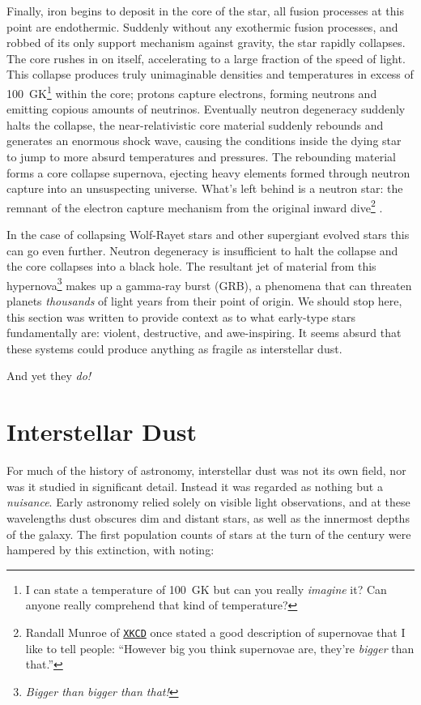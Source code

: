 Finally, iron begins to deposit in the core of the star, all fusion processes at this point are endothermic.
Suddenly without any exothermic fusion processes, and robbed of its only support mechanism against gravity, the star rapidly collapses.
The core rushes in on itself, accelerating to a large fraction of the speed of light.
This collapse produces truly unimaginable densities and temperatures in excess of \SI{100}{\giga\kelvin}\footnote{I can state a temperature of \SI{100}{\giga\kelvin} but can you really \emph{imagine} it? Can anyone really comprehend that kind of temperature?} within the core; protons capture electrons, forming neutrons and emitting copious amounts of neutrinos.
Eventually neutron degeneracy suddenly halts the collapse, the near-relativistic core material suddenly rebounds and generates an enormous shock wave, causing the conditions inside the dying star to jump to more absurd temperatures and pressures.
The rebounding material forms a core collapse supernova, ejecting heavy elements formed through neutron capture into an unsuspecting universe.
What's left behind is a neutron star: the remnant of the electron capture mechanism from the original inward dive\footnote{Randall Munroe of \href{https://what-if.xkcd.com/73/}{\texttt{XKCD}} once stated a good description of supernovae that I like to tell people: ``However big you think supernovae are, they're \emph{bigger} than that.''} \parencite[Ch.~13]{longairHighEnergyAstrophysics2011}.

In the case of collapsing Wolf-Rayet stars and other supergiant evolved stars this can go even further.
Neutron degeneracy is insufficient to halt the collapse and the core collapses into a black hole.
The resultant jet of material from this hypernova\footnote{\emph{Bigger than bigger than that!}} makes up a gamma-ray burst (GRB), a phenomena that can threaten planets \emph{thousands} of light years from their point of origin.
We should stop here, this section was written to provide context as to what early-type stars fundamentally are: violent, destructive, and awe-inspiring.
It seems absurd that these systems could produce anything as fragile as interstellar dust.

And yet they \emph{do!}

\section{Interstellar Dust}
\label{sec:dust}

For much of the history of astronomy, interstellar dust was not its own field, nor was it studied in significant detail.
Instead it was regarded as nothing but a \emph{nuisance}.
Early astronomy relied solely on visible light observations, and at these wavelengths dust obscures dim and distant stars, as well as the innermost depths of the galaxy.
The first population counts of stars at the turn of the  century were hampered by this extinction, with \textcite{kapteynAbsorptionLightSpace1909} noting:

